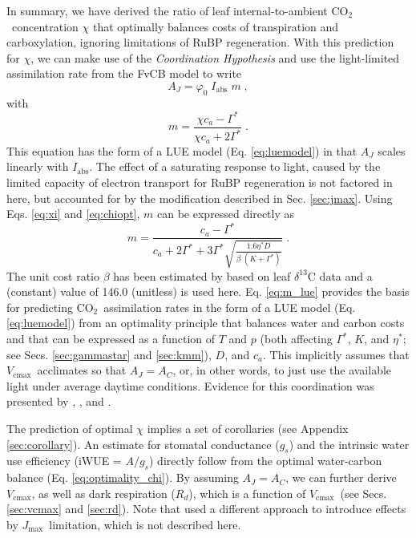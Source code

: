 \documentclass{myreport}
\newcommand{\coo}{CO$_2$}
\newcommand{\vcmax}{$V_{\text{cmax}}$}
\newcommand{\jmax}{$J_{\text{max}}$}
\begin{document}
In summary, we have derived the ratio of leaf internal-to-ambient \coo\ concentration $\chi$ that optimally balances costs of transpiration and carboxylation, ignoring limitations of RuBP regeneration.  
With this prediction for $\chi$, we can make use of the \textit{Coordination Hypothesis} and use the light-limited assimilation rate from the FvCB model to write
\begin{equation}
        A_J = \varphi_0 \; I_{\mathrm{abs}}\;m \;,
\end{equation}
with
\begin{equation}
    m = \frac{\chi c_a - \Gamma^{\ast}}{\chi c_a + 2\Gamma^{\ast}}\;.
\end{equation}
This equation has the form of a LUE model (Eq. \ref{eq:luemodel}) in that $A_J$ scales linearly with $I_{\mathrm{abs}}$. The effect of a saturating response to light, caused by the limited capacity of electron transport for RuBP regeneration is not factored in here, but accounted for by the modification described in Sec. \ref{sec:jmax}. Using Eqs. \ref{eq:xi} and \ref{eq:chiopt}, $m$ can be expressed directly as
\begin{equation}
\label{eq:m_lue}
    m = \frac{c_a - \Gamma^{\ast}}{c_a + 2 \Gamma^{\ast} + 3 \Gamma^{\ast} \sqrt{\frac{1.6 \eta^{\ast} D }{\beta\;(K+\Gamma^{\ast})}}} \;.
\end{equation}
The unit cost ratio $\beta$ has been estimated by \cite{wang17natpl} based on leaf $\delta^{13}$C data and a (constant) value of 146.0 (unitless) is used here. Eq. \ref{eq:m_lue} provides the basis for predicting \coo\ assimilation rates in the form of a LUE model (Eq. \ref{eq:luemodel}) from an optimality principle that balances water and carbon costs and that can be expressed as a function of $T$ and $p$ (both affecting $\Gamma^{\ast}$, $K$, and $\eta^\ast$; see Secs. \ref{sec:gammastar} and \ref{sec:kmm}), $D$, and $c_a$. This implicitly assumes that \vcmax\ acclimates so that $A_J=A_C$, or, in other words, to just use the available light under average daytime conditions. Evidence for this coordination was presented by \cite{chen93}, \cite{haxeltine96}, and \cite{maire12po}. 

The prediction of optimal $\chi$ implies a set of corollaries (see Appendix \ref{sec:corollary}). An estimate for stomatal conductance ($g_s$) and the intrinsic water use efficiency (iWUE = $A/g_s$) directly follow from the optimal water-carbon balance (Eq. \ref{eq:optimality_chi}). By assuming $A_J=A_C$, we can further derive \vcmax , as well as dark respiration ($R_d$), which is a function of \vcmax\ (see Secs. \ref{sec:vcmax} and \ref{sec:rd}). Note that \cite{smith19ecollett} used a different approach to introduce effects by \jmax\ limitation, which is not described here.
\end{document}
